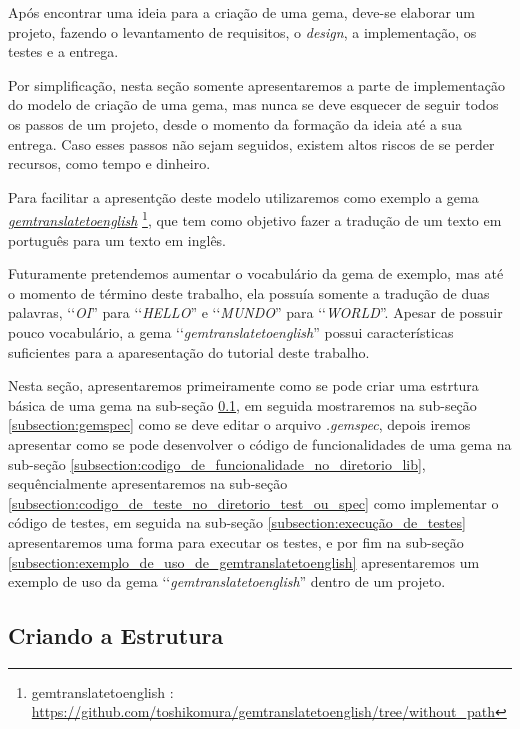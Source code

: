 Após encontrar uma ideia para a criação de uma gema, deve-se elaborar um projeto, fazendo o levantamento
de requisitos, o \emph{design}, a implementação, os testes e a entrega.

Por simplificação, nesta seção somente apresentaremos a parte de implementação do modelo de criação de uma
gema, mas nunca se deve esquecer de seguir todos os passos de um projeto, desde o momento da formação da
ideia até a sua entrega. Caso esses passos não sejam seguidos, existem altos riscos de se perder recursos,
como tempo e dinheiro.

Para facilitar a apresentção deste modelo utilizaremos como exemplo a gema
\emph{\href{https://github.com/toshikomura/gemtranslatetoenglish/tree/without_path}{gemtranslatetoenglish}}
\footnote{gemtranslatetoenglish : \url{https://github.com/toshikomura/gemtranslatetoenglish/tree/without_path}},
que tem como objetivo fazer a tradução de um texto em português para um texto em inglês.

Futuramente pretendemos aumentar o vocabulário da gema de exemplo, mas até o momento de término deste
trabalho, ela possuía somente a tradução de duas palavras, ‘‘\emph{OI}'' para ‘‘\emph{HELLO}'' e
‘‘\emph{MUNDO}'' para ‘‘\emph{WORLD}''. Apesar de possuir pouco vocabulário, a gema ‘‘\emph{gemtranslatetoenglish}''
possui características suficientes para a aparesentação do tutorial deste trabalho.

Nesta seção, apresentaremos primeiramente como se pode criar uma estrtura básica de uma gema na sub-seção
\ref{subsection:criando_a_estrutura}, em seguida mostraremos na sub-seção \ref{subsection:gemspec} como
se deve editar o arquivo \emph{.gemspec}, depois iremos apresentar como se pode desenvolver o código
de funcionalidades de uma gema na sub-seção \ref{subsection:codigo_de_funcionalidade_no_diretorio_lib},
sequêncialmente apresentaremos na sub-seção \ref{subsection:codigo_de_teste_no_diretorio_test_ou_spec} como
implementar o código de testes, em seguida na sub-seção \ref{subsection:execução_de_testes} apresentaremos
uma forma para executar os testes, e por fim na sub-seção \ref{subsection:exemplo_de_uso_de_gemtranslatetoenglish}
apresentaremos um exemplo de uso da gema ‘‘\emph{gemtranslatetoenglish}'' dentro de um projeto.


\subsection{Criando a Estrutura}
\label{subsection:criando_a_estrutura}

